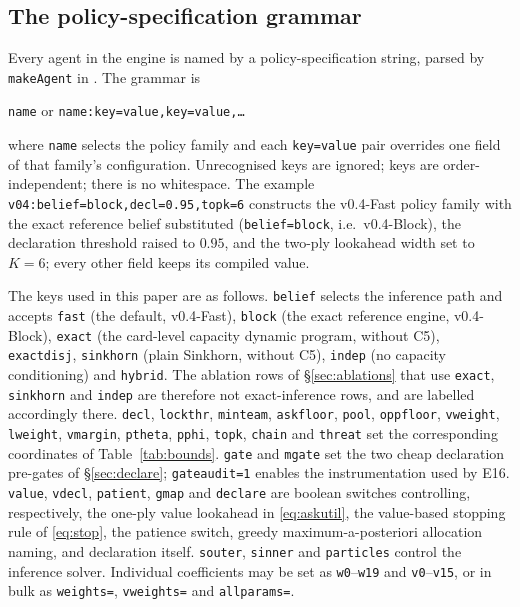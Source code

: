 \documentclass[11pt]{article}
\theoremstyle{definition}
\DeclareRobustCommand{\vfast}{\texorpdfstring{\mbox{v0.4-Fast}}{v0.4-Fast}}
\DeclareRobustCommand{\vblock}{\texorpdfstring{\mbox{v0.4-Block}}{v0.4-Block}}
\begin{document}
\subsection{The policy-specification grammar}

Every agent in the engine is named by a policy-specification string, parsed by
\texttt{makeAgent} in . The grammar is

\begin{center}
\texttt{name} \quad or \quad \texttt{name:key=value,key=value,\dots}
\end{center}

\noindent where \texttt{name} selects the policy family and each
\texttt{key=value} pair overrides one field of that family's configuration.
Unrecognised keys are ignored; keys are order-independent; there is no
whitespace. The example \texttt{v04:belief=block,decl=0.95,topk=6} constructs the
\vfast{} policy family with the exact reference belief substituted
(\texttt{belief=block}, i.e.\ \vblock{}), the declaration threshold raised to
$0.95$, and the two-ply lookahead width set to $K = 6$; every other field keeps
its compiled value.

The keys used in this paper are as follows. \texttt{belief} selects the inference
path and accepts \texttt{fast} (the default, \vfast{}), \texttt{block} (the exact
reference engine, \vblock{}), \texttt{exact} (the card-level capacity dynamic
program, without C5), \texttt{exactdisj}, \texttt{sinkhorn} (plain Sinkhorn,
without C5), \texttt{indep} (no capacity conditioning) and \texttt{hybrid}. The
ablation rows of \S\ref{sec:ablations} that use \texttt{exact},
\texttt{sinkhorn} and \texttt{indep} are therefore not exact-inference rows, and
are labelled accordingly there. \texttt{decl}, \texttt{lockthr},
\texttt{minteam}, \texttt{askfloor}, \texttt{pool}, \texttt{oppfloor},
\texttt{vweight}, \texttt{lweight}, \texttt{vmargin}, \texttt{ptheta},
\texttt{pphi}, \texttt{topk}, \texttt{chain} and \texttt{threat} set the
corresponding coordinates of Table~\ref{tab:bounds}. \texttt{gate} and
\texttt{mgate} set the two cheap declaration pre-gates of \S\ref{sec:declare};
\texttt{gateaudit=1} enables the instrumentation used by E16. \texttt{value},
\texttt{vdecl}, \texttt{patient}, \texttt{gmap} and \texttt{declare} are boolean
switches controlling, respectively, the one-ply value lookahead in
\eqref{eq:askutil}, the value-based stopping rule of \eqref{eq:stop}, the
patience switch, greedy maximum-a-posteriori allocation naming, and declaration
itself. \texttt{souter}, \texttt{sinner} and \texttt{particles} control the
inference solver. Individual coefficients may be set as \texttt{w0}--\texttt{w19}
and \texttt{v0}--\texttt{v15}, or in bulk as \texttt{weights=},
\texttt{vweights=} and \texttt{allparams=}.
\end{document}
